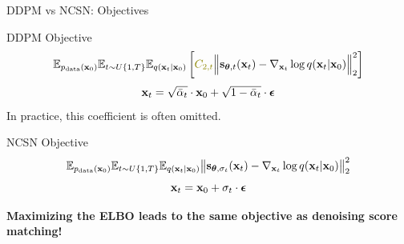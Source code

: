 \documentclass{beamer}
\begin{document}
\begin{frame}{DDPM vs NCSN: Objectives}
	\begin{block}{DDPM Objective}
		\vspace{-0.5cm}
		\[
			\bbE_{\pd(\bx_0)} \bbE_{t \sim U\{1, T\}}\bbE_{q(\bx_t | \bx_0)} \left[ {\color{olive}C_{2, t}} \Bigl\|  \bs_{\btheta, t} (\bx_t) - \nabla_{\bx_t} \log q(\bx_t | \bx_0) \Bigr\|_2^2  \right]
		\]
		\[
			\mathbf{x}_t = \sqrt{\bar{\alpha}_t} \cdot \mathbf{x}_0 + \sqrt{1 - \bar{\alpha}_t} \cdot \boldsymbol{\epsilon}
		\]
		\eqpause
		In practice, {\color{olive}this coefficient} is often omitted.
	\end{block}
	\eqpause
	\begin{block}{NCSN Objective}
		\vspace{-0.3cm}
		\[
			\mathbb{E}_{p_{\text{data}}(\mathbf{x}_0)} \mathbb{E}_{t \sim U\{1, T\}} \mathbb{E}_{q(\mathbf{x}_t | \mathbf{x}_0)}\bigl\| \mathbf{s}_{\boldsymbol{\theta}, \sigma_t}(\mathbf{x}_t) - \nabla_{\mathbf{x}_t} \log q(\mathbf{x}_t | \mathbf{x}_0) \bigr\|^2_2 
		\]
		\[
			\mathbf{x}_t = \mathbf{x}_0 + \sigma_t \cdot \boldsymbol{\epsilon}
		\]
		\vspace{-0.5cm}
	\end{block}
	\eqpause
	\textbf{Maximizing the ELBO leads to the same objective as denoising score matching!}
\end{frame}
\end{document}
